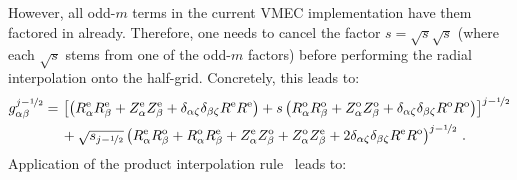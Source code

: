However, all odd-$m$ terms in the current VMEC implementation have them factored in already.
Therefore, one needs to cancel the factor $s = \sqrt{s} \sqrt{s}$ (where each $\sqrt{s}$ stems from one of the odd-$m$ factors)
before performing the radial interpolation onto the half-grid.
Concretely, this leads to:
\begin{align}
  g_{\alpha \beta}^{j-\nicefrac{1}{2}} =&\, \left[     \left(   R_\alpha^\mathrm{e} R_\beta^\mathrm{e} + Z_\alpha^\mathrm{e} Z_\beta^\mathrm{e}
                                                    + \delta_{\alpha \zeta} \delta_{\beta \zeta} R^\mathrm{e} R^\mathrm{e} \right)
                                         + s \left(   R_\alpha^\mathrm{o} R_\beta^\mathrm{o} + Z_\alpha^\mathrm{o} Z_\beta^\mathrm{o}
                                                    + \delta_{\alpha \zeta} \delta_{\beta \zeta} R^\mathrm{o} R^\mathrm{o} \right) \right]^{j-\nicefrac{1}{2}} \nonumber \\
                             ~&\, + \sqrt{s_{j-\nicefrac{1}{2}}}   \left(   R_\alpha^\mathrm{e} R_\beta^\mathrm{o} + R_\alpha^\mathrm{o} R_\beta^\mathrm{e}
                                                                + Z_\alpha^\mathrm{e} Z_\beta^\mathrm{o} + Z_\alpha^\mathrm{o} Z_\beta^\mathrm{e}
                                                                + 2 \delta_{\alpha \zeta} \delta_{\beta \zeta} R^\mathrm{e} R^\mathrm{o} \right)^{j-\nicefrac{1}{2}} \, .
\end{align}
Application of the product interpolation rule~ leads to:
